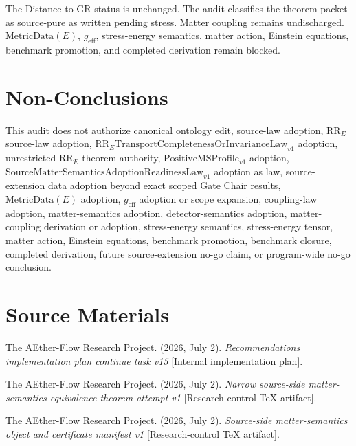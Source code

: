 \documentclass[11pt]{article}
\newcommand{\MetricData}{\mathrm{MetricData}}
\newcommand{\geff}{g_{\mathrm{eff}}}
\begin{document}
The Distance-to-GR status is unchanged. The audit classifies the theorem
packet as source-pure as written pending stress. Matter coupling remains
undischarged. \(\MetricData(E)\), \(\geff\), stress-energy semantics, matter
action, Einstein equations, benchmark promotion, and completed derivation
remain blocked.

\section{Non-Conclusions}

This audit does not authorize canonical ontology edit, source-law adoption,
\(\mathrm{RR}_{E}\) source-law adoption,
\(\mathrm{RR}_{E}\mathrm{TransportCompletenessOrInvarianceLaw}_{v1}\)
adoption, unrestricted \(\mathrm{RR}_{E}\) theorem authority,
\(\mathrm{PositiveMSProfile}_{v1}\) adoption,
\(\mathrm{SourceMatterSemanticsAdoptionReadinessLaw}_{v1}\) adoption as law,
source-extension data adoption beyond exact scoped Gate Chair results,
\(\MetricData(E)\) adoption, \(\geff\) adoption or scope expansion,
coupling-law adoption, matter-semantics adoption, detector-semantics adoption,
matter-coupling derivation or adoption, stress-energy semantics,
stress-energy tensor, matter action, Einstein equations, benchmark promotion,
benchmark closure, completed derivation, future source-extension no-go claim,
or program-wide no-go conclusion.

\section{Source Materials}

The AEther-Flow Research Project. (2026, July 2). \emph{Recommendations
implementation plan continue task v15} [Internal implementation plan].

The AEther-Flow Research Project. (2026, July 2). \emph{Narrow source-side
matter-semantics equivalence theorem attempt v1} [Research-control TeX
artifact].

The AEther-Flow Research Project. (2026, July 2). \emph{Source-side
matter-semantics object and certificate manifest v1} [Research-control TeX
artifact].
\end{document}
